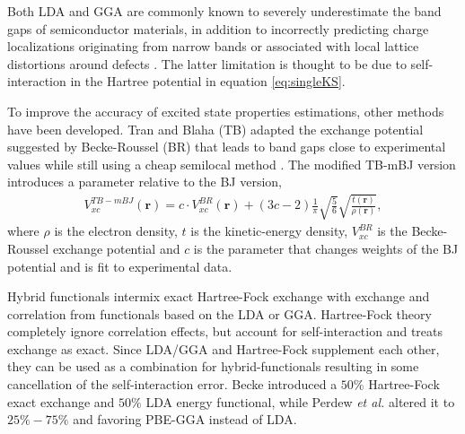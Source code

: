 Both LDA and GGA are commonly known to severely underestimate the band gaps of semiconductor materials, in addition to incorrectly predicting charge localizations originating from narrow bands or associated with local lattice distortions around defects \cite{Freysoldt2014}. The latter limitation is thought to be due to self-interaction in the Hartree potential in equation \ref{eq:singleKS}.

To improve the accuracy of excited state properties estimations, other methods have been developed. Tran and Blaha (TB) \cite{Tran2009} adapted the exchange potential suggested by Becke-Roussel (BR) \cite{Becke2006} that leads to band gaps close to experimental values while still using a cheap semilocal method \cite{Koller2011}. The modified TB-mBJ version introduces a parameter relative to the BJ version,
\begin{align}
    V_{xc}^{TB-mBJ}(\textbf{r}) =  c\cdot V_{xc}^{BR}(\textbf{r}) + (3c-2) \frac{1}{\pi} \sqrt{\frac{5}{6}} \sqrt{\frac{t(\textbf{r})}{\rho(\textbf{r})}},
\end{align}
where $\rho$ is the electron density, $t$ is the kinetic-energy density, $V_{xc}^{BR}$ is the Becke-Roussel exchange potential and $c$ is the parameter that changes weights of the BJ potential and is fit to experimental data.

Hybrid functionals intermix exact Hartree-Fock exchange with exchange and correlation from functionals based on the LDA or GGA. Hartree-Fock theory completely ignore correlation effects, but account for self-interaction and treats exchange as exact. Since LDA/GGA and Hartree-Fock supplement each other, they can be used as a combination for hybrid-functionals resulting in some cancellation of the self-interaction error. Becke \cite{Becke1993} introduced a $50\%$ Hartree-Fock exact exchange and
$50\%$ LDA energy functional, while Perdew \textit{et al.} \cite{Perdew1996a} altered it to $25\%-75\%$ and favoring PBE-GGA instead of LDA.

